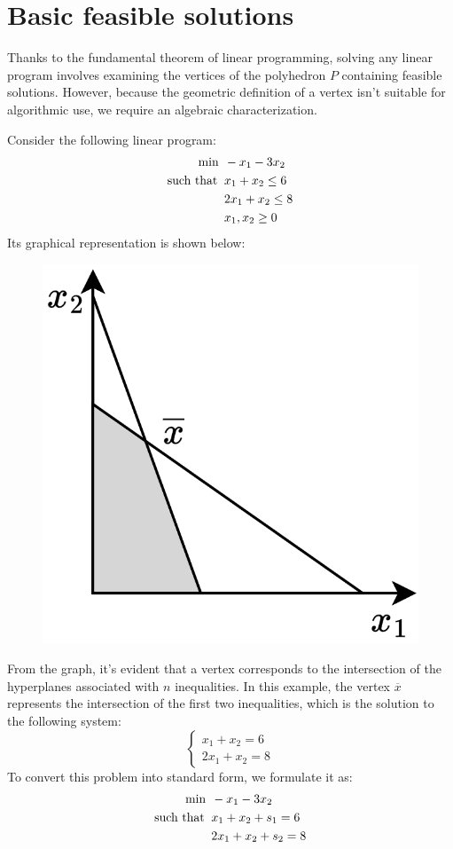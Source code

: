 \section{Basic feasible solutions}

Thanks to the fundamental theorem of linear programming, solving any linear program involves examining the vertices of the polyhedron $P$ containing feasible solutions.
However, because the geometric definition of a vertex isn't suitable for algorithmic use, we require an algebraic characterization.
\begin{example}
    Consider the following linear program:
    \begin{align*}
        \min                      \:&\: -x_1-3x_2          \\
        \textnormal{such that }     &\: x_1+x_2 \leq 6  \\
                                    &\: 2x_1+x_2 \leq 8  \\
                                    &\: x_1,x_2 \geq 0
    \end{align*}
    Its graphical representation is shown below:
    \begin{figure}[H]
        \centering
        \includegraphics[width=0.25\linewidth]{images/lp.png}
    \end{figure}
    From the graph, it's evident that a vertex corresponds to the intersection of the hyperplanes associated with $n$ inequalities. 
    In this example, the vertex $\overline{x}$ represents the intersection of the first two inequalities, which is the solution to the following system:
    \[
    \begin{cases}
        x_1+x_2=6 \\
        2x_1+x_2=8
    \end{cases}
    \]
    To convert this problem into standard form, we formulate it as:
    \begin{align*}
        \min                      \:&\: -x_1-3x_2          \\
        \textnormal{such that }     &\: x_1+x_2+s_1 = 6  \\
                                    &\: 2x_1+x_2+s_2 = 8  \\

\end{align*}
\end{example}
